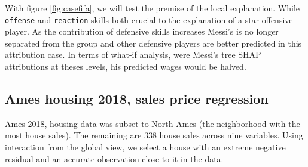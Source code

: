 \documentclass[
]{article}
\begin{document}
With figure \ref{fig:casefifa}, we will test the premise of the local explanation. While \texttt{offense} and \texttt{reaction} skills both crucial to the explanation of a star offensive player. As the contribution of defensive skills increases Messi's is no longer separated from the group and other defensive players are better predicted in this attribution case. In terms of what-if analysis, were Messi's tree SHAP attributions at theses levels, his predicted wages would be halved.

\hypertarget{ames-housing-2018-sales-price-regression}{%
\subsection{Ames housing 2018, sales price regression}\label{ames-housing-2018-sales-price-regression}}

Ames 2018, housing data was subset to North Ames (the neighborhood with the most house sales). The remaining are 338 house sales across nine variables. Using interaction from the global view, we select a house with an extreme negative residual and an accurate observation close to it in the data.
\end{document}
